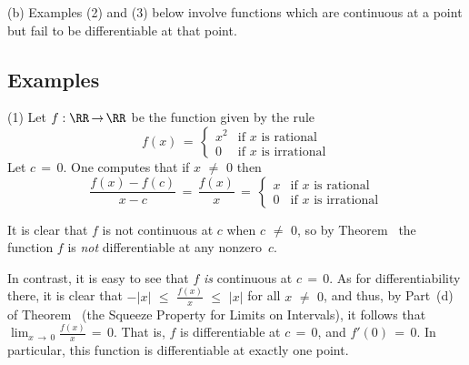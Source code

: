\V

        (b) Examples (2) and (3) below involve functions which are continuous at a point but fail to be differentiable at that point. \Q

\V


            \subsection{\small{\bf Examples}}
            \label{ExampE20.40}

\V

        \hspace*{\parindent}(1) Let $f:{\RR} \,{\rightarrow}\, {\RR}$ be the function given by the rule
        \begin{displaymath}
        f(x) \,=\,  \left\{
        \begin{array}{ll}
        x^{2} & \mbox{if $x$ is rational} \\
         0    & \mbox{if $x$ is irrational}
        \end{array}
        \right.
        \end{displaymath}
    Let $c \,=\, 0$. One computes that if $x \,\,{\neq}\,\, 0$ then
        \begin{displaymath}
        \frac{f(x)-f(c)}{x-c} \,=\, \frac{f(x)}{x} \,=\, 
        \left\{
        \begin{array}{ll}
         x & \mbox{if $x$ is rational} \\
         0 & \mbox{if $x$ is irrational}
        \end{array}
                    \right.
        \end{displaymath}

        It is clear that $f$ is not continuous at $c$ when $c \,\,{\neq}\,\, 0$,
    so by Theorem~ the function $f$ is {\em not} differentiable at any nonzero~$c$.

    In contrast, it is easy to see that $f$ {\em is} continuous at $c \,=\, 0$. As for differentiability there, it is clear that
    ${\displaystyle -|x|\,\,{\leq}\,\,\frac{f(x)}{x}\,\,{\leq}\,\,|x|}$ for all $x \,\,{\neq}\,\, 0$, 
    and thus, by Part~(d) of Theorem~ (the Squeeze Property for Limits on Intervals),
    it follows that ${\displaystyle \lim_{x \,{\rightarrow}\, 0} \frac{f(x)}{x} \,=\, 0}$.
    That is, $f$ is differentiable at $c \,=\, 0$, and $f'(0) \,=\, 0$. In particular, this function is differentiable at exactly one point.

\V

